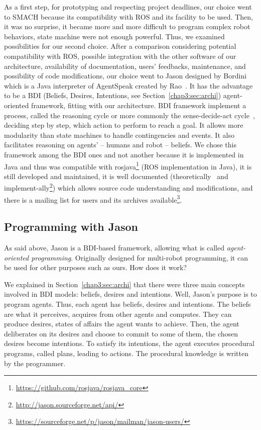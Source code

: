 \documentclass[a4paper,11pt,twoside]{StyleThese}
\begin{document}
As a first step, for prototyping and respecting project deadlines, our choice went to SMACH because its compatibility with ROS and its facility to be used. Then, it was no surprise, it became more and more difficult to program complex robot behaviors, state machine were not enough powerful. Thus, we examined possibilities for our second choice. After a comparison considering potential compatibility with ROS, possible integration with the other software of our architecture, availability of documentation, users' feedbacks, maintenance, and possibility of code modifications, our choice went to Jason designed by Bordini \etal~\cite{bordini_2007_jason} which is a Java interpreter of AgentSpeak created by Rao~\cite{rao_1996_agentspeak}. It has the advantage to be a BDI (Beliefs, Desires, Intentions, see Section~\ref{chap3:sec:archi}) agent-oriented framework, fitting with our architecture. BDI framework implement a process, called the reasoning cycle or more commonly the sense-decide-act cycle~\cite{albus_1991_outline}, deciding step by step, which action to perform to reach a goal. It allows more modularity than state machines to handle contingencies and events. It also facilitates reasoning on agents' -- humans and robot -- beliefs. We chose this framework among the BDI ones and not another because it is implemented in Java and thus was compatible with rosjava\footnote{\url{https://github.com/rosjava/rosjava_core}} (\ie ROS implementation in Java), it is still developed and maintained, it is well documented (theoretically~\cite{bordini_2007_jason} and implement-ally\footnote{\url{http://jason.sourceforge.net/api/}}) which allows source code understanding and modifications, and there is a mailing list for users and its archives available\footnote{\url{https://sourceforge.net/p/jason/mailman/jason-users/}}.

\subsection{Programming with Jason}\label{chap4:subsec:jason}
As said above, Jason is a BDI-based framework, allowing what is called \textit{agent-oriented programming}. Originally designed for multi-robot programming, it can be used for other purposes such as ours. How does it work?

We explained in Section~\ref{chap3:sec:archi} that there were three main concepts involved in BDI models: beliefs, desires and intentions. Well, Jason's purpose is to program agents. Thus, each agent has beliefs, desires and intentions. The beliefs are what it perceives, acquires from other agents and computes. They can produce desires, \ie states of affairs the agent wants to achieve. Then, the agent deliberates on its desires and choose to commit to some of them, \ie the chosen desires become intentions. To satisfy its intentions, the agent executes procedural programs, called plans, leading to actions. The procedural knowledge is written by the programmer.
\end{document}
